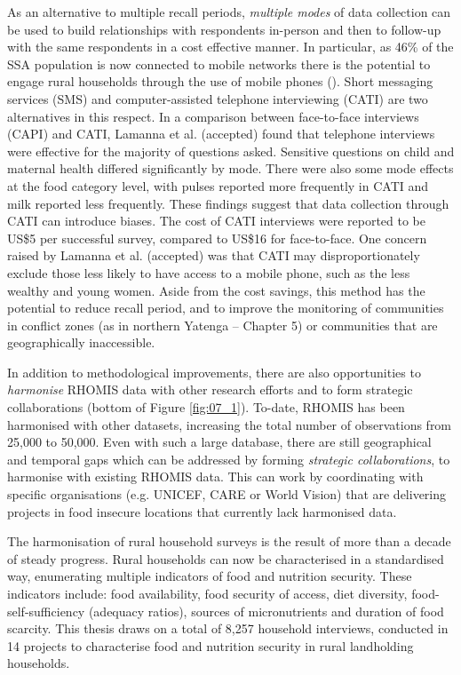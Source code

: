 As an alternative to multiple recall periods, \textit{multiple modes} of data collection can be used to build relationships with respondents in-person and then to follow-up with the same respondents in a cost effective manner. In particular, as 46\% of the SSA population is now connected to mobile networks there is the potential to engage rural households through the use of mobile phones (\citealp{GSMAIntelligence2016}). Short messaging services (SMS) and computer-assisted telephone interviewing (CATI) are two alternatives in this respect. In a comparison between face-to-face interviews (CAPI) and CATI, Lamanna et al. (accepted) found that telephone interviews were effective for the majority of questions asked. Sensitive questions on child and maternal health differed significantly by mode. There were also some mode effects at the food category level, with pulses reported more frequently in CATI and milk reported less frequently. These findings suggest that data collection through CATI can introduce biases. The cost of CATI interviews were reported to be US\$5 per successful survey, compared to US\$16 for face-to-face. One concern raised by Lamanna et al. (accepted) was that CATI may disproportionately exclude those less likely to have access to a mobile phone, such as the less wealthy and young women. Aside from the cost savings, this method has the potential to reduce recall period, and to improve the monitoring of communities in conflict zones (as in northern Yatenga -- Chapter 5) or communities that are geographically inaccessible.

In addition to methodological improvements, there are also opportunities to \textit{harmonise} RHOMIS data with other research efforts and to form strategic collaborations (bottom of Figure \ref{fig:07_1}). To-date, RHOMIS has been harmonised with other datasets, increasing the total number of observations from 25,000 to 50,000. Even with such a large database, there are still geographical and temporal gaps which can be addressed by forming \textit{strategic collaborations}, to harmonise with existing RHOMIS data. This can work by coordinating with specific organisations (e.g. UNICEF, CARE or World Vision) that are delivering projects in food insecure locations that currently lack harmonised data.

The harmonisation of rural household surveys is the result of more than a decade of steady progress. Rural households can now be characterised in a standardised way, enumerating multiple indicators of food and nutrition security. These indicators include: food availability, food security of access, diet diversity, food-self-sufficiency (adequacy ratios), sources of micronutrients and duration of food scarcity. This thesis draws on a total of 8,257 household interviews, conducted in 14 projects to characterise food and nutrition security in rural landholding households.

